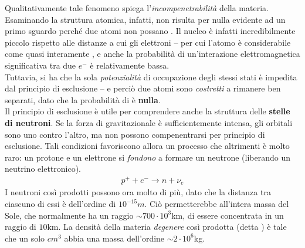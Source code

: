 \documentclass[../../FisicaTeorica.tex]{subfiles}
\begin{document}
Qualitativamente tale fenomeno spiega l'\textit{incompenetrabilità} della materia.\\
Esaminando la struttura atomica, infatti, non risulta per nulla evidente ad un primo sguardo perché due atomi non possano . Il nucleo è infatti incredibilmente piccolo rispetto alle distanze a cui  gli elettroni -- per cui l'atomo è considerabile come quasi interamente , e anche la probabilità di un'interazione elettromagnetica significativa tra due $e^-$ è relativamente bassa.\\
Tuttavia, si ha che la sola \textit{potenzialità} di occupazione degli stessi stati è impedita dal principio di esclusione -- e perciò due atomi sono \textit{costretti} a rimanere ben separati, dato che la probabilità di  è \textbf{nulla}.\\

Il principio di esclusione è utile per comprendere anche la struttura delle \textbf{stelle di neutroni}. Se la forza di gravitazionale è sufficientemente intensa, gli orbitali sono  uno contro l'altro, ma non possono compenentrarsi per principio di esclusione. Tali condizioni favoriscono allora un processo che altrimenti è molto raro: un protone e un elettrone si \textit{fondono} a formare un neutrone (liberando un neutrino elettronico).
\begin{align*}
p^+ + e^- \to n + \nu_e
\end{align*}
I neutroni così prodotti possono ora  molto di più, dato che la distanza tra ciascuno di essi è dell'ordine di $10^{-15}m$. Ciò permetterebbe all'intera massa del Sole, che normalmente ha un raggio $\sim 700\cdot 10^3$km, di essere concentrata in un raggio di $10$km. La densità della materia \textit{degenere} così prodotta (detta ) è tale che un solo $cm^3$ abbia una massa dell'ordine $\sim 2\cdot 10^6$kg.\\
\end{document}
